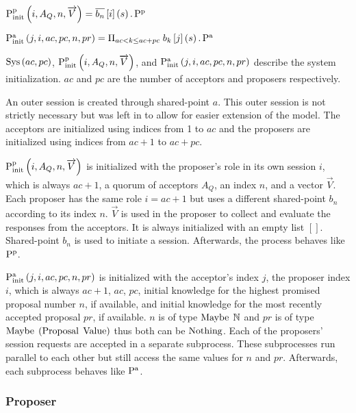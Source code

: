 $\operatorname{P^p_{init}}\left(i, A_Q, n, \overrightarrow{V}\right) = \overline{b_n}\left[i\right]\left(s\right) . \operatorname{P^p}$

$\operatorname{P^a_{init}}\left(j, i, ac, pc, n, pr\right) = \Pi_{ac < k \le ac + pc}\; b_k\left[j\right]\left(s\right) . \operatorname{P^a}$

$\operatorname{Sys}\left(ac, pc\right)$, $\operatorname{P^p_{init}}\left(i, A_Q, n, \overrightarrow{V}\right)$, and $\operatorname{P^a_{init}}\left(j, i, ac, pc, n, pr\right)$ describe the system initialization.
$ac$ and $pc$ are the number of acceptors and proposers respectively.

An outer session is created through shared-point $a$.
This outer session is not strictly necessary but was left in to allow for easier extension of the model.
The acceptors are initialized using indices from 1 to $ac$ and the proposers are initialized using indices from $ac + 1$ to $ac + pc$.

$\operatorname{P^p_{init}}\left(i, A_Q, n, \overrightarrow{V}\right)$ is initialized with the proposer's role in its own session $i$, which is always $ac + 1$, a quorum of acceptors $A_Q$, an index $n$, and a vector $\overrightarrow{V}$.
Each proposer has the same role $i = ac + 1$ but uses a different shared-point $b_n$ according to its index $n$.
$\overrightarrow{V}$ is used in the proposer to collect and evaluate the responses from the acceptors.
It is always initialized with an empty list $[]$.
Shared-point $b_n$ is used to initiate a session.
Afterwards, the process behaves like $\operatorname{P^p}$.

$\operatorname{P^a_{init}}\left(j, i, ac, pc, n, pr\right)$ is initialized with the acceptor's index $j$, the proposer index $i$, which is always $ac + 1$, $ac$, $pc$, initial knowledge for the highest promised proposal number $n$, if available, and initial knowledge for the most recently accepted proposal $pr$, if available.
$n$ is of type $\operatorname{Maybe}\; \mathbb{N}$ and $pr$ is of type $\operatorname{Maybe}\; \left(\operatorname{Proposal}\; \operatorname{Value}\right)$ thus both can be $\operatorname{Nothing}$.
Each of the proposers' session requests are accepted in a separate subprocess.
These subprocesses run parallel to each other but still access the same values for $n$ and $pr$.
Afterwards, each subprocess behaves like $\operatorname{P^a}$.

\subsubsection{Proposer}
\newcommand{\SendUnreliableP}[5]{#1\left[#2, #3\right]!_u #4 \left\langle #5 \right\rangle}
\newcommand{\ReceiveUnreliableP}[6]{#1\left[#2, #3\right]?_u #4 \left\langle #5 \right\rangle \left(#6\right)}
\newcommand{\ceil}[1]{\Big\lceil #1 \Big\rceil}
\newcommand{\SendWeaklyP}[5]{#1\left[#2, #3\right]!_w #4.#5}
\newcommand{\ReceiveWeaklyP}[4]{#1\left[#2, #3\right]?_w #4}
\newcommand{\If}[1]{\operatorname{if}\; #1}
\newcommand{\Then}[1]{\operatorname{then}\; #1}
\newcommand{\Else}[1]{\operatorname{else}\; #1}
\newcommand{\update}[2]{\operatorname{update} \left(#1, #2\right)}

